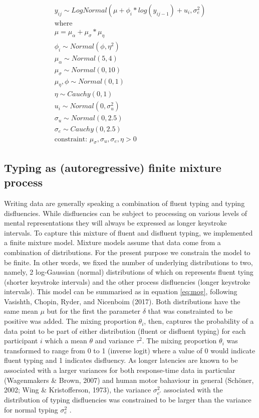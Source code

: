 \documentclass[english,jou,floatsintext]{apa7}
\begin{document}
\[
\tag{2}
\begin{aligned}
y_{ij} \sim LogNormal(\mu + \phi_i*log(y_{ij-1}) + u_i, \sigma_e^2)\\
\text{where}\\
\mu = \mu_{\alpha} + \mu_{\sigma} * \mu_{\eta}\\
\phi_i \sim Normal(\phi, \eta^2)\\
\mu_{\alpha} \sim Normal(5,4)\\
\mu_{\sigma} \sim Normal(0,10)\\
\mu_{\eta}, \phi \sim Normal(0, 1)\\
\eta \sim Cauchy(0, 1)\\
u_i \sim Normal(0, \sigma_u^2)\\
\sigma_u \sim Normal(0,2.5)\\
\sigma_e \sim Cauchy(0,2.5)\\
\text{constraint: }\mu_{\sigma}, \sigma_u, \sigma_e, \eta >0 
\end{aligned}
\label{eq:ark}
\]

\hypertarget{typing-as-autoregressive-finite-mixture-process}{%
\subsection{Typing as (autoregressive) finite mixture process}\label{typing-as-autoregressive-finite-mixture-process}}

Writing data are generally speaking a combination of fluent typing and typing disfluencies. While disfluencies can be subject to processing on various levels of mental representations they will always be expressed as longer keystroke intervals. To capture this mixture of fluent and disfluent typing, we implemented a finite mixture model. Mixture models assume that data come from a combination of distributions. For the present purpose we constrain the model to be finite. In other words, we fixed the number of underlying distributions to two, namely, 2 log-Gaussian (normal) distributions of which on represents fluent tying (shorter keystroke intervals) and the other process disfluencies (longer keystroke intervals). This model can be summarised as in equation \ref{eq:mog}, following Vasishth, Chopin, Ryder, and Nicenboim (2017). Both distributions have the same mean \(\mu\) but for the first the parameter \(\delta\) that was constrainted to be positive was added. The mixing proportion \(\theta_i\), then, captures the probability of a data point to be part of either distribution (fluent or disfluent typing) for each participant \(i\) which a mean \(\theta\) and variance \(\tau^2\). The mixing proportion \(\theta_i\) was transformed to range from 0 to 1 (inverse logit) where a value of 0 would indicate fluent typing and 1 indicates disfluency. As longer latencies are known to be associated with a larger variances for both response-time data in particular (Wagenmakers \& Brown, 2007) and human motor bahaviour in general (Schöner, 2002; Wing \& Kristofferson, 1973), the variance \(\sigma_{e'}^2\) associated with the distribution of typing disfluencies was constrained to be larger than the variance for normal typing \(\sigma_e^2\) .
\end{document}

